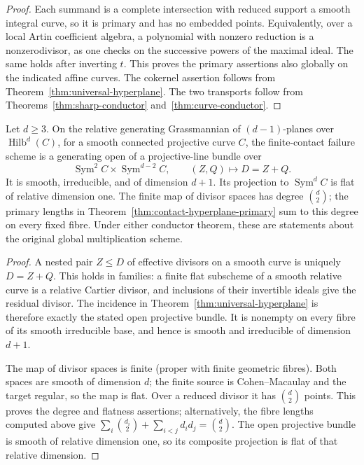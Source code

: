 \begin{proof}
Each summand is a complete intersection with reduced support a
smooth integral curve, so it is primary and has no embedded points.
Equivalently, over a local Artin coefficient algebra, a polynomial
with nonzero reduction is a nonzerodivisor, as one checks on the
successive powers of the maximal ideal. The same holds after
inverting $t$. This proves the primary assertions also globally on
the indicated affine curves. The cokernel assertion follows from
Theorem~\ref{thm:universal-hyperplane}. The two transports follow
from Theorems~\ref{thm:sharp-conductor} and~\ref{thm:curve-conductor}.
\end{proof}

\begin{theorem}\label{thm:moving-hyperplane}
Let $d\ge3$. On the relative generating Grassmannian of $(d-1)$-planes over
$\operatorname{Hilb}^d(C)$, for a smooth connected projective curve $C$, the finite-contact
failure scheme is a generating open of a projective-line bundle over
\[
 \operatorname{Sym}^2 C\times\operatorname{Sym}^{d-2} C,
 \qquad (Z,Q)\longmapsto D=Z+Q.
\]
It is smooth, irreducible, and of dimension $d+1$. Its projection
to $\operatorname{Sym}^d C$ is flat of relative dimension one.
The finite map of divisor spaces has degree $\binom d2$; the primary
lengths in Theorem~\ref{thm:contact-hyperplane-primary} sum to this
degree on every fixed fibre. Under either conductor theorem, these
are statements about the original global multiplication scheme.
\end{theorem}
\begin{proof}
A nested pair $Z\le D$ of effective divisors on a smooth curve is
uniquely $D=Z+Q$. This holds in families: a finite flat subscheme
of a smooth relative curve is a relative Cartier divisor, and
inclusions of their invertible ideals give the residual divisor.
The incidence in Theorem~\ref{thm:universal-hyperplane} is therefore
exactly the stated open projective bundle. It is nonempty on every
fibre of its smooth irreducible base, and hence is smooth and
irreducible of dimension $d+1$.

The map of divisor spaces is finite (proper with finite geometric
fibres). Both spaces are smooth of dimension $d$; the finite source
is Cohen--Macaulay and the target regular, so the map is flat.
Over a reduced divisor it has $\binom d2$ points. This proves the
degree and flatness assertions; alternatively, the fibre lengths
computed above give $\sum_i\binom{d_i}2+\sum_{i<j}d_id_j=\binom d2$.
The open projective bundle is smooth of relative dimension one,
so its composite projection is flat of that relative dimension.
\end{proof}

